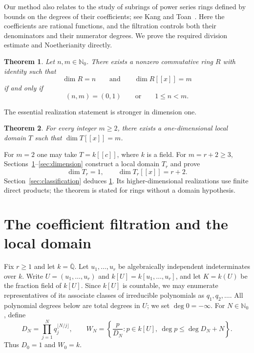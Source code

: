 \documentclass[11pt,reqno]{amsart}
\numberwithin{equation}{section}
\theoremstyle{plain}
\newtheorem{theorem}{Theorem}[section]
\theoremstyle{definition}
\theoremstyle{remark}
\newcommand{\N}{\mathbb N}
\begin{document}
Our method also relates to the study of subrings of power series
rings defined by bounds on the degrees of their coefficients; see
Kang and Toan~\cite{KangToan2015a,KangToan2015b}.
Here the coefficients are rational functions, and the filtration
controls both their denominators and their numerator degrees.
We prove the required division estimate and Noetherianity directly.

\begin{theorem}\label{thm:classification}
Let $n,m\in\N_0$. There exists a nonzero commutative ring $R$ with
identity such that
\[
 \dim R=n\qquad\text{and}\qquad\dim R[[x]]=m
\]
if and only if
\[
 (n,m)=(0,1)\qquad\text{or}\qquad 1\le n<m.
\]
\end{theorem}

The essential realization statement is stronger in dimension one.

\begin{theorem}\label{thm:local}
For every integer $m\ge2$, there exists a one-dimensional local
domain $T$ such that $\dim T[[x]]=m$.
\end{theorem}

For $m=2$ one may take $T=k[[c]]$, where $k$ is a field.
For $m=r+2\ge3$, Sections~\ref{sec:filtration}--\ref{sec:dimension}
construct a local domain $T_r$ and prove
\begin{equation}\label{eq:target}
 \dim T_r=1,\qquad \dim T_r[[x]]=r+2.
\end{equation}
Section~\ref{sec:classification} deduces
\cref{thm:classification}. Its higher-dimensional realizations use
finite direct products; the theorem is stated for rings without a
domain hypothesis.

\section{The coefficient filtration and the local domain}
\label{sec:filtration}

Fix $r\ge1$ and let $k=\overline{\mathbb Q}$.
Let $u_1,\ldots,u_r$ be algebraically independent indeterminates
over $k$. Write $U=(u_1,\ldots,u_r)$ and
$k[U]=k[u_1,\ldots,u_r]$, and let $K=k(U)$ be the fraction field
of $k[U]$. Since $k[U]$ is countable,
we may enumerate representatives of its associate classes of
irreducible polynomials as $q_1,q_2,\ldots$. All polynomial degrees
below are total degrees in $U$; we set $\deg0=-\infty$.
For $N\in\N_0$, define
\begin{equation}\label{eq:windows}
 D_N=\prod_{j=1}^{N}q_j^{\lfloor N/j\rfloor},\qquad
 W_N=\left\{\frac{p}{D_N}:p\in k[U],\
             \deg p\le\deg D_N+N\right\}.
\end{equation}
Thus $D_0=1$ and $W_0=k$.
\end{document}
